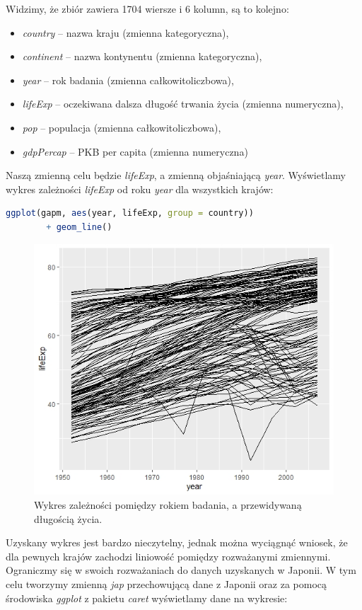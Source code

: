 \documentclass[a4paper]{article}
\begin{document}
Widzimy, że zbiór zawiera 1704 wiersze i 6 kolumn, są to kolejno:
\begin{itemize}
    \item \textit{country} -- nazwa kraju (zmienna kategoryczna),
    \item \textit{continent} -- nazwa kontynentu (zmienna kategoryczna),
    \item \textit{year} -- rok badania (zmienna całkowitoliczbowa),
    \item \textit{lifeExp} --   oczekiwana  dalsza  długość  trwania  życia (zmienna numeryczna), 
    \item \textit{pop} -- populacja (zmienna całkowitoliczbowa),
    \item \textit{gdpPercap} -- PKB per capita (zmienna numeryczna)
\end{itemize}
Naszą zmienną celu będzie \textit{lifeExp}, a zmienną objaśniającą \textit{year}. Wyświetlamy wykres zależności  \textit{lifeExp} od roku \textit{year} dla wszystkich krajów:
\begin{lstlisting}[language=R,frame=single]
ggplot(gapm, aes(year, lifeExp, group = country)) 
        + geom_line()
\end{lstlisting}
\begin{figure}[ht]
    \centering
    \includegraphics[width = 300  pt]{WSZYSTKIEKRAJE.jpeg}
    \caption{Wykres zależności pomiędzy rokiem badania, a przewidywaną długością życia.}
\end{figure}
Uzyskany wykres jest bardzo nieczytelny, jednak można wyciągnąć wniosek, że dla pewnych krajów zachodzi liniowość pomiędzy rozważanymi zmiennymi. Ograniczmy się w swoich rozważaniach do danych uzyskanych w Japonii. W tym celu tworzymy zmienną \textit{jap} przechowującą dane z Japonii oraz za pomocą środowiska \textit{ggplot} z pakietu \textit{caret} wyświetlamy dane na wykresie:
\end{document}
